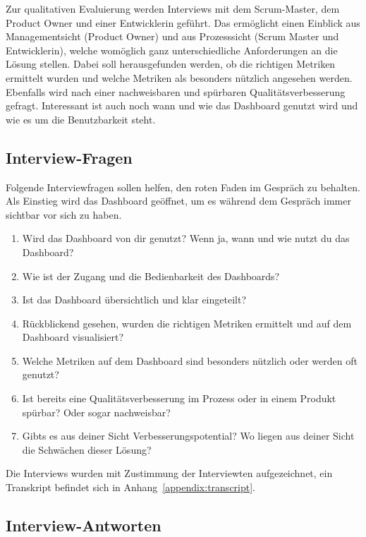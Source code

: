 Zur qualitativen Evaluierung werden Interviews mit dem Scrum-Master, dem Product Owner und einer Entwicklerin geführt.
Das ermöglicht einen Einblick aus Managementsicht (Product Owner) und aus Prozesssicht (Scrum Master und Entwicklerin), welche womöglich ganz unterschiedliche Anforderungen an die Lösung stellen.
Dabei soll herausgefunden werden, ob die richtigen Metriken ermittelt wurden und welche Metriken als besonders nützlich angesehen werden.
Ebenfalls wird nach einer nachweisbaren und spürbaren Qualitätsverbesserung gefragt.
Interessant ist auch noch wann und wie das Dashboard genutzt wird und wie es um die Benutzbarkeit steht.

\subsection{Interview-Fragen}

Folgende Interviewfragen sollen helfen, den roten Faden im Gespräch zu behalten.
Als Einstieg wird das Dashboard geöffnet, um es während dem Gespräch immer sichtbar vor sich zu haben.

\begin{enumerate}
    \item Wird das Dashboard von dir genutzt? Wenn ja, wann und wie nutzt du das Dashboard?
    \item Wie ist der Zugang und die Bedienbarkeit des Dashboards?
    \item Ist das Dashboard übersichtlich und klar eingeteilt?
    \item Rückblickend gesehen, wurden die richtigen Metriken ermittelt und auf dem Dashboard visualisiert?
    \item Welche Metriken auf dem Dashboard sind besonders nützlich oder werden oft genutzt?
    \item Ist bereits eine Qualitätsverbesserung im Prozess oder in einem Produkt spürbar? Oder sogar nachweisbar?
    \item Gibts es aus deiner Sicht Verbesserungspotential? Wo liegen aus deiner Sicht die Schwächen dieser Lösung?
\end{enumerate}

Die Interviews wurden mit Zustimmung der Interviewten aufgezeichnet, ein Transkript befindet sich in Anhang~\ref{appendix:transcript}.

\clearpage
\subsection{Interview-Antworten}

